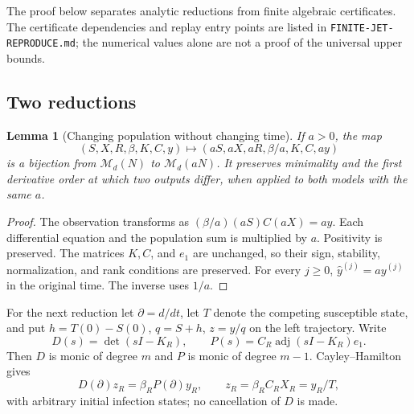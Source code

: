 \documentclass[11pt]{article}
\newtheorem{lemma}[theorem]{Lemma}
\theoremstyle{remark}\newtheorem{remark}[theorem]{Remark}
\begin{document}
The proof below separates analytic reductions from finite algebraic
certificates. The certificate dependencies and replay entry points are
listed in \texttt{FINITE-JET-REPRODUCE.md}; the numerical values alone are
not a proof of the universal upper bounds.

\subsection{Two reductions}
\begin{lemma}[Changing population without changing time]\label{lem:fjscale}
If $a>0$, the map
\[
 (S,X,R,\beta,K,C,y)\longmapsto
 (aS,aX,aR,\beta/a,K,C,ay)
\]
is a bijection from $\mathcal M_d(N)$ to $\mathcal M_d(aN)$.
It preserves minimality and the first derivative order at which two
outputs differ, when applied to both models with the same $a$.
\end{lemma}
\begin{proof}
The observation transforms as $(\beta/a)(aS)C(aX)=ay$.
Each differential equation and the population sum is multiplied by $a$.
Positivity is preserved. The matrices $K,C$, and $e_1$ are unchanged,
so their sign, stability, normalization, and rank conditions are preserved.
For every $j\geq0$, $\widehat y^{(j)}=a y^{(j)}$ in the original time.
The inverse uses $1/a$.
\end{proof}

For the next reduction let $\partial=d/dt$, let $T$ denote the competing
susceptible state, and put $h=T(0)-S(0)$, $q=S+h$, $z=y/q$ on the left
trajectory. Write
\[
 D(s)=\det(sI-K_R),\qquad P(s)=C_R\operatorname{adj}(sI-K_R)e_1.
\]
Then $D$ is monic of degree $m$ and $P$ is monic of degree $m-1$.
Cayley--Hamilton gives
\[
 D(\partial)z_R=\beta_R P(\partial)y_R,
 \qquad z_R=\beta_R C_RX_R=y_R/T,
\]
with arbitrary initial infection states; no cancellation of $D$ is made.
\end{document}
